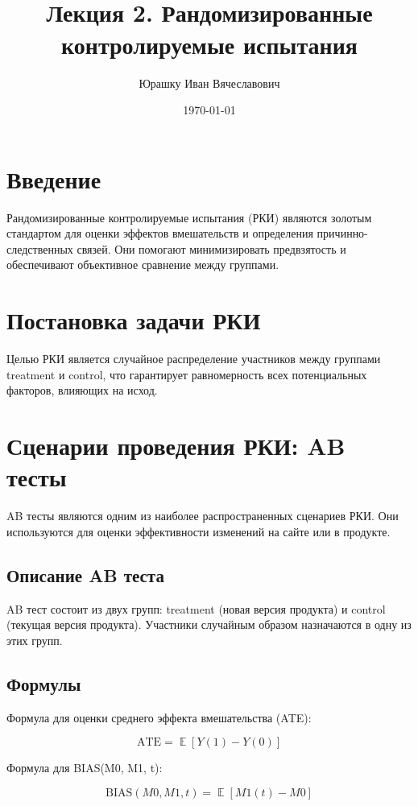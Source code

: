 \documentclass{article}
\title{
    \textbf{\coursename}\\
    Лекция 2. Рандомизированные контролируемые испытания
}
\author{Юрашку Иван Вячеславович}
\date{\today}
\DeclareMathOperator{\E}{\mathbb{E}} %
\begin{document}
\maketitle

\section{Введение}

    Рандомизированные контролируемые испытания (РКИ) являются золотым стандартом для оценки эффектов вмешательств и определения причинно-следственных связей.
    Они помогают минимизировать предвзятость и обеспечивают объективное сравнение между группами.

\section{Постановка задачи РКИ}

    Целью РКИ является случайное распределение участников между группами treatment и control, что гарантирует равномерность всех потенциальных факторов, влияющих на исход.

\section{Сценарии проведения РКИ: AB тесты}

    AB тесты являются одним из наиболее распространенных сценариев РКИ. Они используются для оценки эффективности изменений на сайте или в продукте.

\subsection{Описание AB теста}

    AB тест состоит из двух групп: treatment (новая версия продукта) и control (текущая версия продукта). Участники случайным образом назначаются в одну из этих групп.

\subsection{Формулы}

    Формула для оценки среднего эффекта вмешательства (ATE):

    \[
    \text{ATE} = \E[Y(1) - Y(0)]
    \]

    Формула для BIAS(M0, M1, t):

    \[
    \text{BIAS}(M0, M1, t) = \E[M1(t) - M0]
    \]
\end{document}
